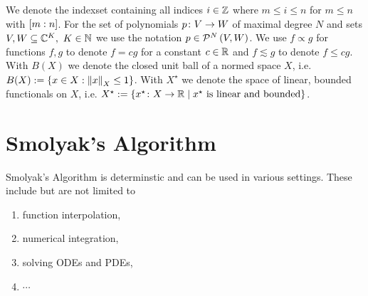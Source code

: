\documentclass[12pt, oneside]{amsart}
\theoremstyle{definition}
\theoremstyle{remark}
\numberwithin{equation}{section}
\begin{document}

We denote the indexset containing all indices $i\in \Z$ 
where $m\leq i\leq n$ for $m\leq n$ with \(\indexset[m]{n}\). For the set of 
polynomials \(p \from V \to W\) of maximal 
degree \(N\) and sets \(V, W \subseteq \C^K,\ K \in \N\) we use the notation 
\(p \in \pols[N]{V, W}\). 
We use \(f \propto g\) for functions \(f, g\) to denote \(f = 
c g\) for a constant \(c \in \R\) and \(f \lesssim g\) to denote \(f \leq c 
g\). With \(B(X)\) we denote the closed unit ball of a normed space \(X\), 
i.e.\ \(B(X) \defn \set{x \in X: \norm[X]{x} \leq 1}\). With \(X^\star\) we 
denote the space of linear, bounded functionals on \(X\), i.e. \(X^\star \defn 
\set{x^\star\from X \to \R \mid x^\star \text{ is linear and bounded}}\).


\section{Smolyak's Algorithm}

Smolyak's Algorithm is determinstic and can be used in various settings. These include but are not limited to
\begin{enumerate}
    \item function interpolation,
    \item numerical integration,
    \item solving ODEs and PDEs,
    \item \(\cdots\)
\end{enumerate}
\end{document}
